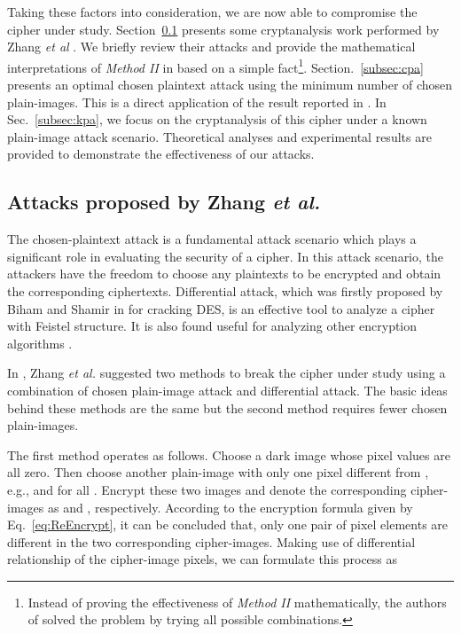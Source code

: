 \documentclass[smallextended, final]{svjour3}          \smartqed
\begin{document}
Taking these factors into consideration, we are now able to compromise the cipher under study.
Section~\ref{subsec:yushuidea} presents some cryptanalysis work performed by Zhang \textit{et al} \cite{zhang2014cryptanalysis}. We briefly review their attacks and
provide the mathematical interpretations of \textit{Method II} in \cite[Sec.~3.2]{zhang2014cryptanalysis} based on a simple
fact\footnote{Instead of proving the effectiveness of \textit{Method II} mathematically, the authors of \cite{zhang2014cryptanalysis} solved the problem by trying all possible combinations.}.
Section.~\ref{subsec:cpa} presents an optimal chosen plaintext attack using the minimum number of chosen plain-images.
This is a direct application of the result reported in \cite{li2008general, li2011optimal}.
In Sec.~\ref{subsec:kpa}, we focus on the cryptanalysis of this cipher under a known plain-image attack scenario.
Theoretical analyses and experimental results are provided to demonstrate the effectiveness of our attacks.

\subsection{Attacks proposed by Zhang \textit{et al.} }
\label{subsec:yushuidea}
The chosen-plaintext attack is a fundamental attack scenario which plays a significant role in evaluating the security of a cipher.
In this attack scenario, the attackers have the freedom to choose any plaintexts
to be encrypted and obtain the corresponding ciphertexts. Differential attack, which was firstly proposed by Biham and Shamir in \cite{Biham:Deslike:Crypt90} for cracking DES, is an
effective tool to analyze a cipher with Feistel structure. It is also found useful for analyzing other encryption algorithms \cite{li2012breaking,zhang2012cryptanalyzing}.

In \cite{zhang2014cryptanalysis}, Zhang \textit{et al.} suggested two methods to break the cipher under study using a combination of
chosen plain-image attack and differential attack. The basic ideas behind these methods are the same but the second method requires fewer
chosen plain-images.



The first method operates as follows.
Choose a dark image  whose pixel values are all zero.
Then choose another plain-image  with only one pixel different from ,
e.g.,  and  for all .
Encrypt these two images and denote the corresponding cipher-images as  and , respectively.
According to the encryption
formula given by Eq.~\eqref{eq:ReEncrypt}, it can be  concluded that,
only one pair of pixel elements are different in the two corresponding
cipher-images. Making use of differential relationship of the cipher-image pixels,
we can formulate this process as
\end{document}
